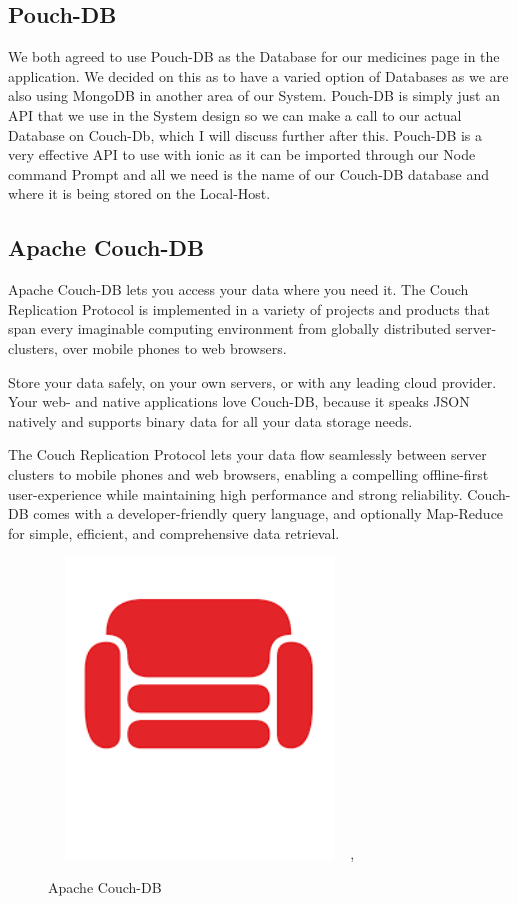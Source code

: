 \documentclass[12pt,a4paper,oneside,openany]{book}
\begin{document}
\subsection{Pouch-DB}
We both agreed to use Pouch-DB as the Database for our medicines page in the application. We decided on this as to have a varied option of Databases as we are also using MongoDB in another area of our System. Pouch-DB is simply just an API that we use in the System design so we can make a call to our actual Database on Couch-Db, which I will discuss further after this. Pouch-DB is a very effective API to use with ionic as it can be imported through our Node command Prompt and all we need is the name of our Couch-DB database and where it is being stored on the Local-Host.

\subsection{Apache Couch-DB}
Apache Couch-DB lets you access your data where you need it. The Couch Replication Protocol is implemented in a variety of projects and products that span every imaginable computing environment from globally distributed server-clusters, over mobile phones to web browsers.

Store your data safely, on your own servers, or with any leading cloud provider. Your web- and native applications love Couch-DB, because it speaks JSON natively and supports binary data for all your data storage needs.

The Couch Replication Protocol lets your data flow seamlessly between server clusters to mobile phones and web browsers, enabling a compelling offline-first user-experience while maintaining high performance and strong reliability. Couch-DB comes with a developer-friendly query language, and optionally Map-Reduce for simple, efficient, and comprehensive data retrieval. \cite{ApacheCouchDB}

\begin{figure}[ht]
\renewcommand\thefigure{4.1}
\centering
\includegraphics[width=8cm, height=8cm]{Images/couch.png},
\caption{Apache Couch-DB}
\label{couch}
\end{figure} 
\end{document}

